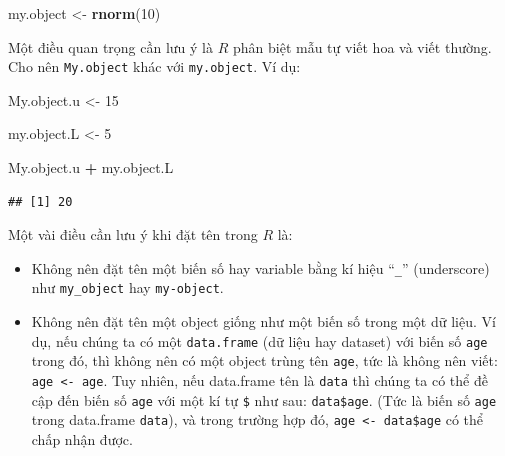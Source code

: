 \documentclass[
]{book}
\newenvironment{Shaded}{\begin{snugshade}}{\end{snugshade}}
\newcommand{\DecValTok}[1]{\textcolor[rgb]{0.00,0.00,0.81}{#1}}
\newcommand{\KeywordTok}[1]{\textcolor[rgb]{0.13,0.29,0.53}{\textbf{#1}}}
\newcommand{\NormalTok}[1]{#1}
\newcommand{\OperatorTok}[1]{\textcolor[rgb]{0.81,0.36,0.00}{\textbf{#1}}}
\newcommand{\StringTok}[1]{\textcolor[rgb]{0.31,0.60,0.02}{#1}}
\providecommand{\tightlist}{%
  \setlength{\itemsep}{0pt}\setlength{\parskip}{0pt}}
\begin{document}
\begin{Shaded}
\begin{Highlighting}[]
\NormalTok{my.object \textless{}{-}}\StringTok{ }\KeywordTok{rnorm}\NormalTok{(}\DecValTok{10}\NormalTok{)}
\end{Highlighting}
\end{Shaded}

Một điều quan trọng cần lưu ý là \(R\) phân biệt mẫu tự viết hoa và viết thường. Cho nên \texttt{My.object} khác với \texttt{my.object}. Ví dụ:

\begin{Shaded}
\begin{Highlighting}[]
\NormalTok{My.object.u \textless{}{-}}\StringTok{ }\DecValTok{15}
\end{Highlighting}
\end{Shaded}

\begin{Shaded}
\begin{Highlighting}[]
\NormalTok{my.object.L \textless{}{-}}\StringTok{ }\DecValTok{5}
\end{Highlighting}
\end{Shaded}

\begin{Shaded}
\begin{Highlighting}[]
\NormalTok{My.object.u }\OperatorTok{+}\StringTok{ }\NormalTok{my.object.L}
\end{Highlighting}
\end{Shaded}

\begin{verbatim}
## [1] 20
\end{verbatim}

Một vài điều cần lưu ý khi đặt tên trong \(R\) là:

\begin{itemize}
\tightlist
\item
  Không nên đặt tên một biến số hay variable bằng kí hiệu ``\texttt{\_}'' (underscore) như \texttt{my\_object} hay \texttt{my-object}.
\item
  Không nên đặt tên một object giống như một biến số trong một dữ liệu. Ví dụ, nếu chúng ta có một \texttt{data.frame} (dữ liệu hay dataset) với biến số \texttt{age} trong đó, thì không nên có một object trùng tên \texttt{age}, tức là không nên viết: \texttt{age\ \textless{}-\ age}. Tuy nhiên, nếu data.frame tên là \texttt{data} thì chúng ta có thể đề cập đến biến số \texttt{age} với một kí tự \texttt{\$} như sau: \texttt{data\$age}. (Tức là biến số \texttt{age} trong data.frame \texttt{data}), và trong trường hợp đó, \texttt{age\ \textless{}-\ data\$age} có thể chấp nhận được.
\end{itemize}
\end{document}
